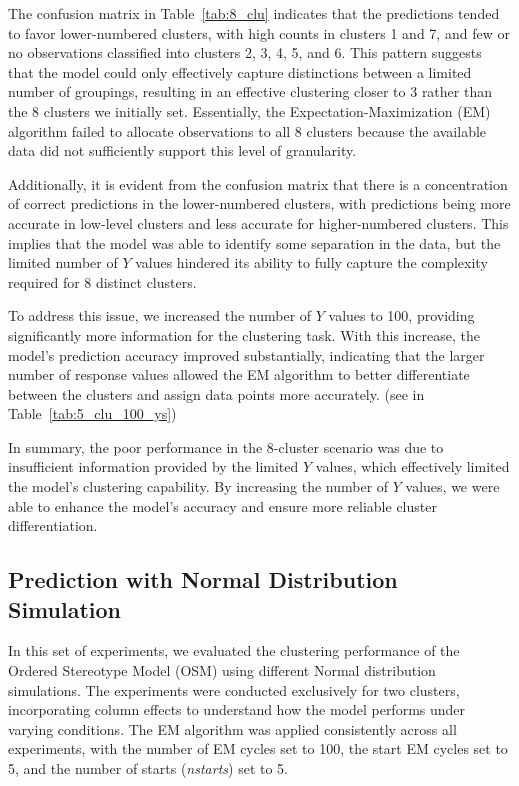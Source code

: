 \documentclass{article}
\begin{document}
The confusion matrix in Table~\ref{tab:8_clu} indicates that the predictions tended to favor lower-numbered clusters, with high counts in clusters 1 and 7, and few or no observations classified into clusters 2, 3, 4, 5, and 6. This pattern suggests that the model could only effectively capture distinctions between a limited number of groupings, resulting in an effective clustering closer to 3 rather than the 8 clusters we initially set. Essentially, the Expectation-Maximization (EM) algorithm failed to allocate observations to all 8 clusters because the available data did not sufficiently support this level of granularity.

Additionally, it is evident from the confusion matrix that there is a concentration of correct predictions in the lower-numbered clusters, with predictions being more accurate in low-level clusters and less accurate for higher-numbered clusters. This implies that the model was able to identify some separation in the data, but the limited number of \(Y\) values hindered its ability to fully capture the complexity required for 8 distinct clusters.

To address this issue, we increased the number of \(Y\) values to 100, providing significantly more information for the clustering task. 
With this increase, the model's prediction accuracy improved substantially, indicating that the larger number of response values allowed the EM algorithm to better differentiate between the clusters and assign data points more accurately. (see in Table~\ref{tab:5_clu_100_ys})

In summary, the poor performance in the 8-cluster scenario was due to insufficient information provided by the limited \(Y\) values, which effectively limited the model's clustering capability. By increasing the number of \(Y\) values, we were able to enhance the model's accuracy and ensure more reliable cluster differentiation.


\subsection{Prediction with Normal Distribution Simulation}

In this set of experiments, we evaluated the clustering performance of the Ordered Stereotype Model (OSM) using different Normal distribution simulations. 
The experiments were conducted exclusively for two clusters, incorporating column effects to understand how the model performs under varying conditions. 
The EM algorithm was applied consistently across all experiments, with the number of EM cycles set to 100, the start EM cycles set to 5, and the number of starts (\textit{nstarts}) set to 5.
\end{document}
